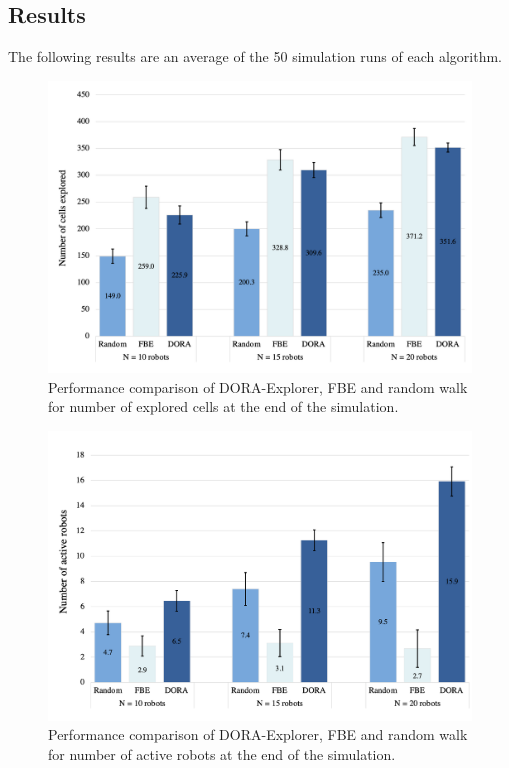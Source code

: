 \subsection{Results}
The following results are an average of the 50 simulation runs of each algorithm. 
\begin{figure}[htbp]
    \centering
    \includegraphics[width=0.95\columnwidth]{images/cell_explored.png}
    \caption{Performance comparison of DORA-Explorer, FBE and random walk for number of explored cells at the end of the simulation.}
    \label{results:exploration}
\end{figure}

\begin{figure}[htbp]
    \centering
    \includegraphics[width=0.95\columnwidth]{images/active_robot.png}
    \caption{Performance comparison of DORA-Explorer, FBE and random walk for number of active robots at the end of the simulation.}
    \label{results:active}
\end{figure}


